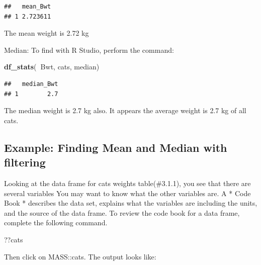 \documentclass[]{book}
\newenvironment{Shaded}{\begin{snugshade}}{\end{snugshade}}
\newcommand{\KeywordTok}[1]{\textcolor[rgb]{0.13,0.29,0.53}{\textbf{#1}}}
\newcommand{\NormalTok}[1]{#1}
\newcommand{\OperatorTok}[1]{\textcolor[rgb]{0.81,0.36,0.00}{\textbf{#1}}}
\begin{document}
\begin{verbatim}
##   mean_Bwt
## 1 2.723611
\end{verbatim}

The mean weight is 2.72 kg

Median:
To find with R Studio, perform the command:

\begin{Shaded}
\begin{Highlighting}[]
\KeywordTok{df_stats}\NormalTok{(}\OperatorTok{~}\NormalTok{Bwt, cats, median)}
\end{Highlighting}
\end{Shaded}

\begin{verbatim}
##   median_Bwt
## 1        2.7
\end{verbatim}

The median weight is 2.7 kg also. It appears the average weight is 2.7 kg of all cats.

\hypertarget{example-finding-mean-and-median-with-filtering}{%
\subsection{Example: Finding Mean and Median with filtering}\label{example-finding-mean-and-median-with-filtering}}

Looking at the data frame for cats weights table(\#3.1.1), you see that there are several variables You may want to know what the other variables are. A * Code Book * describes the data set, explains what the variables are including the units, and the source of the data frame.
To review the code book for a data frame, complete the following command.

\begin{Shaded}
\begin{Highlighting}[]
\NormalTok{??cats}
\end{Highlighting}
\end{Shaded}

Then click on MASS::cats.
The output looks like:
\end{document}
